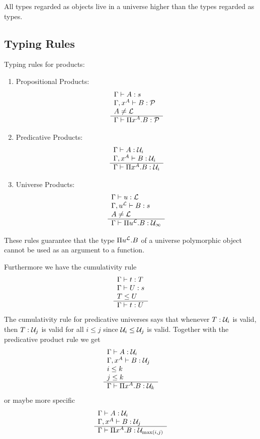 All types regarded as objects live in a universe higher than the types regarded
as types.




\subsection{Typing Rules}


Typing rules for products:
\begin{enumerate}
    \item Propositional Products:
        $$
            \begin{array}{l} 
                \Gamma \vdash A: s
                \\
                \Gamma, x^A \vdash B: {\mathcal P}
                \\
                A \ne {\mathcal L}
             \\ \hline 
                \Gamma \vdash \Pi x^A. B : {\mathcal P}
             \end{array}
        $$
    \item Predicative Products:
        $$
            \begin{array}{l} 
                \Gamma \vdash A: {\mathcal U}_i
                \\
                \Gamma, x^A \vdash B: {\mathcal U}_i
             \\ \hline 
                \Gamma \vdash \Pi x^A. B : {\mathcal U}_i
             \end{array}
        $$

    \item Universe Products:
        $$
            \begin{array}{l} 
                \Gamma \vdash u: {\mathcal L}
                \\
                \Gamma, u^{\mathcal L} \vdash B: s
                \\
                A \ne {\mathcal L}
             \\ \hline 
                \Gamma \vdash \Pi u^{\mathcal L}. B : {\mathcal U}_\infty
             \end{array}
        $$
\end{enumerate}
These rules guarantee that the type $\Pi u^{\mathcal L}. B$ of a universe polymorphic
object cannot be used as an argument to a function.


Furthermore we have the cumulativity rule
$$
\begin{array}{l} 
    \Gamma \vdash t : T
    \\
    \Gamma \vdash U : s
    \\
    T \le U
 \\ \hline 
    \Gamma \vdash t : U
 \end{array}
$$
The cumulativity rule for predicative universes says that whenever $T: {\mathcal U}_i$
is valid, then $T: {\mathcal U}_j$ is valid for all $i \le j$ since ${\mathcal U}_i \le {\mathcal U}_j$
is valid.  Together with the predicative product rule we get
$$
\begin{array}{l} 
    \Gamma \vdash A: {\mathcal U}_i
    \\
    \Gamma, x^A \vdash B: {\mathcal U}_j
    \\
    i \le k
    \\
    j \le k
 \\ \hline 
    \Gamma \vdash \Pi x^A.B : {\mathcal U}_k
 \end{array}
$$
or maybe more specific
$$
\begin{array}{l} 
    \Gamma \vdash A: {\mathcal U}_i
    \\
    \Gamma, x^A \vdash B: {\mathcal U}_j
 \\ \hline 
    \Gamma \vdash \Pi x^A.B : {\mathcal U}_{\text{max}(i,j)}
 \end{array}
$$






